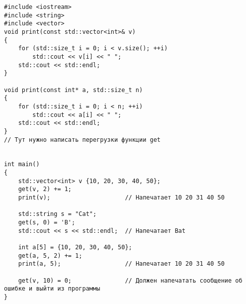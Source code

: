 \documentclass{article}
\begin{document}
\begin{lstlisting}
#include <iostream>
#include <string>
#include <vector>
void print(const std::vector<int>& v)
{
    for (std::size_t i = 0; i < v.size(); ++i)
        std::cout << v[i] << " ";
    std::cout << std::endl;
}

void print(const int* a, std::size_t n)
{
    for (std::size_t i = 0; i < n; ++i)
        std::cout << a[i] << " ";
    std::cout << std::endl;
}
// Тут нужно написать перегрузки функции get


int main()
{
    std::vector<int> v {10, 20, 30, 40, 50};
    get(v, 2) += 1;
    print(v);                     // Напечатает 10 20 31 40 50
    
    std::string s = "Cat";
    get(s, 0) = 'B';
    std::cout << s << std::endl;  // Напечатает Bat
    
    int a[5] = {10, 20, 30, 40, 50};
    get(a, 5, 2) += 1;
    print(a, 5);                  // Напечатает 10 20 31 40 50
    
    get(v, 10) = 0;               // Должен напечатать сообщение об ошибке и выйти из программы
}
\end{lstlisting} 


\iffalse
\newpage
\section*{Необязательные задачи (не входят в ДЗ, никак не учитываются)}
\setcounter{subsection}{0}
\subsection{Разделение строки}
\fi
\end{document}
